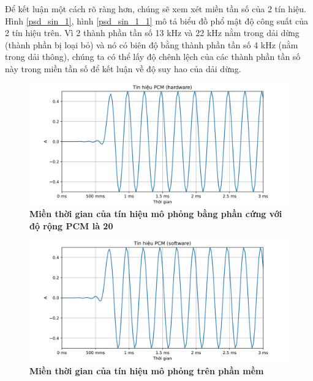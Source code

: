 Để kết luận một cách rõ ràng hơn, chúng sẽ xem xét miền tần số của 2 tín hiệu. Hình \ref{psd_sin_1}, hình \ref{psd_sin_1_1} mô tả biểu đồ phổ mật độ công suất của 2 tín hiệu trên. Vì 2 thành phần tần số 13 kHz và 22 kHz nằm trong dải dừng (thành phần bị loại bỏ) và nó có biên độ bằng thành phần tần số 4 kHz (nằm trong dải thông), chúng ta có thể lấy độ chênh lệch của các thành phần tần số này trong miền tần số để kết luận về độ suy hao của dải dừng.

\begin{figure}[H]
    \centering
    \includegraphics[width=14cm]{Images/Chuong4/tb/sim/sin_1.png}
    \caption[Miền thời gian của tín hiệu mô phỏng bằng phần cứng với độ rộng PCM là 20]{\bfseries \fontsize{12pt}{0pt}\selectfont Miền thời gian của tín hiệu mô phỏng bằng phần cứng với độ rộng PCM là 20}
    \label{sin_1}
\end{figure}

\begin{figure}[H]
    \centering
    \includegraphics[width=14cm]{Images/Chuong4/tb/sim/sin_1_1.png}
    \caption[Miền thời gian của tín hiệu mô phỏng trên phần mềm với độ rộng PCM là 20]{\bfseries \fontsize{12pt}{0pt}\selectfont Miền thời gian của tín hiệu mô phỏng trên phần mềm}
    \label{sin_1_1}
\end{figure}

